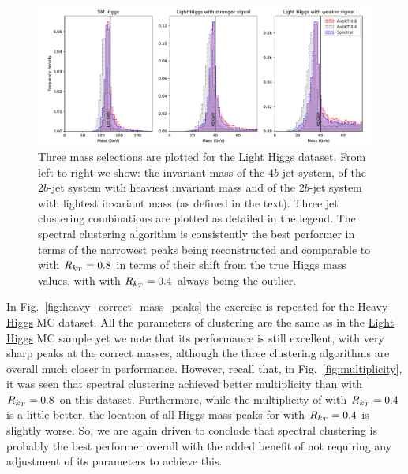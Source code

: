 \begin{figure}[htp]
    \includegraphics[width=1.\textwidth]{graphics/mass_peaks/light_long_correct_lines.pdf}
    \caption{Three mass selections are plotted for the \underline{Light Higgs} dataset. From left to right we show: the invariant mass of the $4b$-jet system, of the $2b$-jet system with heaviest invariant mass and of the $2b$-jet system with lightest invariant mass (as defined in the text).   Three jet clustering combinations are plotted as detailed in the legend.
        The spectral clustering algorithm is consistently the best performer in terms of the narrowest peaks being reconstructed and comparable to \antikt{} with \(R_{k_T}{} = 0.8\) in terms of their shift from the true Higgs mass values, with \antikt{} with \(R_{k_T}{} = 0.4\) always being the outlier. 
    }\label{fig:best_correct_h_allocation}
\end{figure}    

In 
Fig.~\ref{fig:heavy_correct_mass_peaks} the exercise is repeated for the \underline{Heavy Higgs} MC dataset.
All the parameters of \spectral{} clustering are the same as in the \underline{Light Higgs} MC sample yet we note that 
its performance is still excellent, with very sharp peaks at the correct masses, although the three clustering algorithms are overall much closer in performance.
However, recall that, in Fig.~\ref{fig:multiplicity},
it was seen that spectral clustering achieved better multiplicity than \antikt{} with \(R_{k_T}{} = 0.8\) on this dataset. Furthermore, 
while the multiplicity of \antikt{} with \(R_{k_T}{} = 0.4\) is a little better, the location of all Higgs mass peaks for \antikt{} with 
\(R_{k_T} = 0.4\) is slightly worse. So, we are again driven to conclude that spectral clustering is probably the best performer overall with the added benefit of not requiring any adjustment of its parameters to achieve this. 

